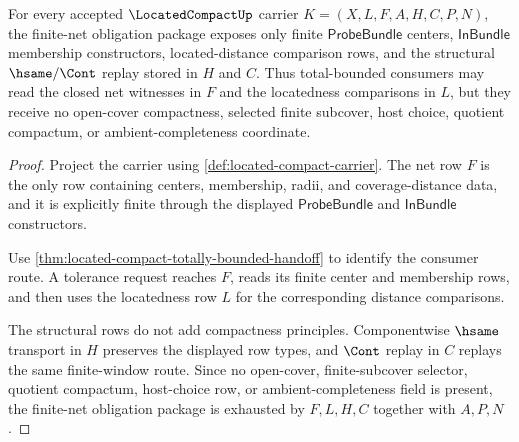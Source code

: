 \begin{theorem}
\label{thm:located-compact-net-obligation-package}
For every accepted $\LocatedCompactUp$ carrier $K=(X,L,F,A,H,C,P,N)$, the finite-net obligation package exposes only finite $\mathsf{ProbeBundle}$ centers, $\mathsf{InBundle}$ membership constructors, located-distance comparison rows, and the structural $\hsame/\Cont$ replay stored in $H$ and $C$. Thus total-bounded consumers may read the closed net witnesses in $F$ and the locatedness comparisons in $L$, but they receive no open-cover compactness, selected finite subcover, host choice, quotient compactum, or ambient-completeness coordinate.
\end{theorem}
\begin{proof}
Project the carrier using \autoref{def:located-compact-carrier}. The net row $F$ is the only row containing centers, membership, radii, and coverage-distance data, and it is explicitly finite through the displayed $\mathsf{ProbeBundle}$ and $\mathsf{InBundle}$ constructors.

Use \autoref{thm:located-compact-totally-bounded-handoff} to identify the consumer route. A tolerance request reaches $F$, reads its finite center and membership rows, and then uses the locatedness row $L$ for the corresponding distance comparisons.

The structural rows do not add compactness principles. Componentwise $\hsame$ transport in $H$ preserves the displayed row types, and $\Cont$ replay in $C$ replays the same finite-window route. Since no open-cover, finite-subcover selector, quotient compactum, host-choice row, or ambient-completeness field is present, the finite-net obligation package is exhausted by $F,L,H,C$ together with $A,P,N$.
\end{proof}

